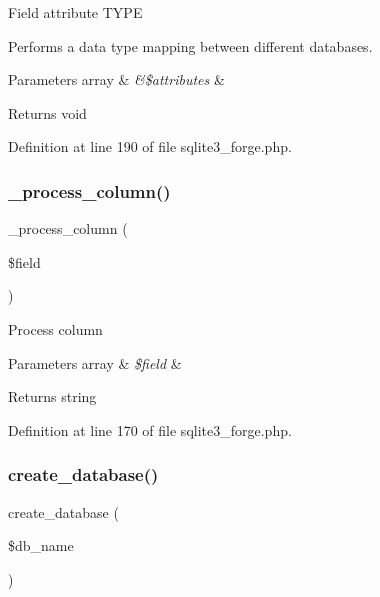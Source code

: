 Field attribute T\+Y\+PE

Performs a data type mapping between different databases.


\begin{DoxyParams}[1]{Parameters}
array & {\em \&\$attributes} & \\
\hline
\end{DoxyParams}
\begin{DoxyReturn}{Returns}
void 
\end{DoxyReturn}


Definition at line 190 of file sqlite3\+\_\+forge.\+php.

\mbox{\label{class_c_i___d_b__sqlite3__forge_a8f38f1c5b5dddecca4befbe393f3f299}} 
\subsubsection{\texorpdfstring{\_process\_column()}{\_process\_column()}}
{\footnotesize\ttfamily \+\_\+process\+\_\+column (\begin{DoxyParamCaption}\item[{}]{\$field }\end{DoxyParamCaption})\hspace{0.3cm}{\ttfamily [protected]}}

Process column


\begin{DoxyParams}[1]{Parameters}
array & {\em \$field} & \\
\hline
\end{DoxyParams}
\begin{DoxyReturn}{Returns}
string 
\end{DoxyReturn}


Definition at line 170 of file sqlite3\+\_\+forge.\+php.

\mbox{\label{class_c_i___d_b__sqlite3__forge_a902a7267babceb2ce595706f217e00ad}} 
\subsubsection{\texorpdfstring{create\_database()}{create\_database()}}
{\footnotesize\ttfamily create\+\_\+database (\begin{DoxyParamCaption}\item[{}]{\$db\+\_\+name }\end{DoxyParamCaption})}

